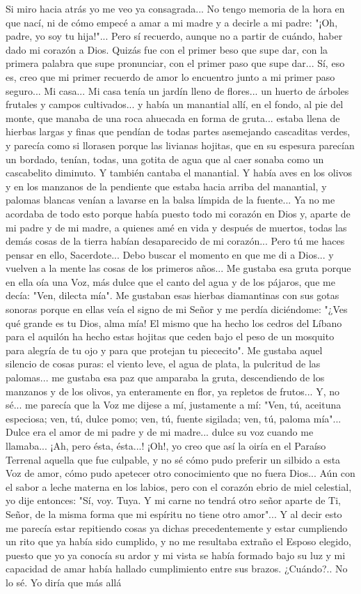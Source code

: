 \documentclass[12pt, twoside, openright]{book} %
\begin{document}
Si miro hacia atrás yo me veo ya consagrada... No tengo memoria de la hora en que nací, ni de cómo empecé a amar a mi madre y a decirle a mi padre: "¡Oh, padre, yo soy tu hija!"... Pero sí recuerdo, aunque no a partir de cuándo, haber dado mi corazón a Dios. Quizás fue con el primer beso que supe dar, con la primera palabra que supe pronunciar, con el primer paso que supe dar... Sí, eso es, creo que mi primer recuerdo de amor lo encuentro junto a mi primer paso seguro... Mi casa... Mi casa tenía un jardín lleno de flores... un huerto de árboles frutales y campos cultivados... y había un manantial allí, en el fondo, al pie del monte, que manaba de una roca ahuecada en forma de gruta... estaba llena de hierbas largas y finas que pendían de todas partes asemejando cascaditas verdes, y parecía como si llorasen porque las livianas hojitas, que en su espesura parecían un bordado, tenían, todas, una gotita de agua que al caer sonaba como un cascabelito diminuto. Y también cantaba el manantial. Y había aves en los olivos y en los manzanos de la pendiente que estaba hacia arriba del manantial, y palomas blancas venían a lavarse en la balsa límpida de la fuente... Ya no me acordaba de todo esto porque había puesto todo mi corazón en Dios y, aparte de mi padre y de mi madre, a quienes amé en vida y después de muertos, todas las demás cosas de la tierra habían desaparecido de mi corazón... Pero tú me haces pensar en ello, Sacerdote... Debo buscar el momento en que me di a Dios... y vuelven a la mente las cosas de los primeros años... Me gustaba esa gruta porque en ella oía una Voz, más dulce que el canto del agua y de los pájaros, que me decía: "Ven, dilecta mía". Me gustaban esas hierbas diamantinas con sus gotas sonoras porque en ellas veía el signo de mi Señor y me perdía diciéndome: "¿Ves qué grande es tu Dios, alma mía! El mismo que ha hecho los cedros del Líbano para el aquilón ha hecho estas hojitas que ceden bajo el peso de un mosquito para alegría de tu ojo y para que protejan tu piececito". Me gustaba aquel silencio de cosas puras: el viento leve, el agua de plata, la pulcritud de las palomas... me gustaba esa paz que amparaba la gruta, descendiendo de los manzanos y de los olivos, ya enteramente en flor, ya repletos de frutos... Y, no sé... me parecía que la Voz me dijese a mí, justamente a mí: "Ven, tú, aceituna especiosa; ven, tú, dulce pomo; ven, tú, fuente sigilada; ven, tú, paloma mía"... Dulce era el amor de mi padre y de mi madre... dulce su voz cuando me llamaba... ¡Ah, pero ésta, ésta...! ¡Oh!, yo creo que así la oiría en el Paraíso Terrenal aquella que fue culpable, y no sé cómo pudo preferir un silbido a esta Voz de amor, cómo pudo apetecer otro conocimiento que no fuera Dios... Aún con el sabor a leche materna en los labios, pero con el corazón ebrio de miel celestial, yo dije entonces: "Sí, voy. Tuya. Y mi carne no tendrá otro señor aparte de Ti, Señor, de la misma forma que mi espíritu no tiene otro amor"... Y al decir esto me parecía estar repitiendo cosas ya dichas precedentemente y estar cumpliendo un rito que ya había sido cumplido, y no me resultaba extraño el Esposo elegido, puesto que yo ya conocía su ardor y mi vista se había formado bajo su luz y mi capacidad de amar había hallado cumplimiento entre sus brazos. ¿Cuándo?.. No lo sé. Yo diría que más allá 
\end{document}
